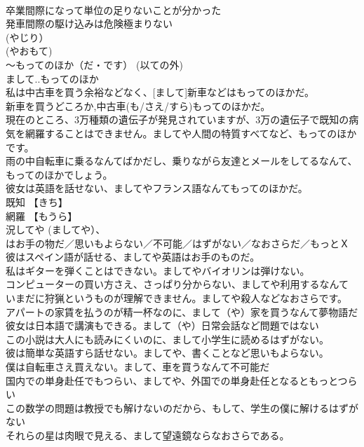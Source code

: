 \documentclass[8pt]{extreport}
\begin{document}
\begin{CJK}{UTF8}{min}
\\	卒業間際になって単位の足りないことが分かった 
\\	発車間際の駆け込みは危険極まりない 
\\	(やじり） 
\\	(やおもて)
\\	～もってのほか（だ・です） (以ての外) 
\\	まして..もってのほか	
\\	私は中古車を買う余裕などなく、[まして]新車などはもってのほかだ。 
\\	新車を買うどころか,中古車(も/さえ/すら)もってのほかだ。
\\	現在のところ、3万種類の遺伝子が発見されていますが、3万の遺伝子で既知の病気を網羅することはできません。ましてや人間の特質すべてなど、もってのほかです。
\\	雨の中自転車に乗るなんてばかだし、乗りながら友達とメールをしてるなんて、もってのほかでしょう。 
\\	彼女は英語を話せない、ましてやフランス語なんてもってのほかだ。 
\\	既知 【きち】 
\\	網羅 【もうら】 
\\	況して{や} (ましてや）、 
\\	はお手の物だ／思いもよらない／不可能／はずがない／なおさらだ／もっとＸ	
\\	彼はスペイン語が話せる、ましてや英語はお手のものだ。 
\\	私はギターを弾くことはできない。ましてやバイオリンは弾けない。
\\	コンピューターの買い方さえ、さっぱり分からない、ましてや利用するなんて 
\\	いまだに狩猟というものが理解できません。ましてや殺人などなおさらです。 
\\	アパートの家賃を払うのが精一杯なのに、まして（や）家を買うなんて夢物語だ 
\\	彼女は日本語で講演もできる。まして（や）日常会話など問題ではない 
\\	この小説は大人にも読みにくいのに、まして小学生に読めるはずがない。 
\\	彼は簡単な英語すら話せない。ましてや、書くことなど思いもよらない。 
\\	僕は自転車さえ買えない。まして、車を買うなんて不可能だ 
\\	国内での単身赴任でもつらい、ましてや、外国での単身赴任となるともっとつらい 
\\	この数学の問題は教授でも解けないのだから、もして、学生の僕に解けるはずがない 
\\	それらの星は肉眼で見える、まして望遠鏡ならなおさらである。 

\end{CJK}
\end{document}
